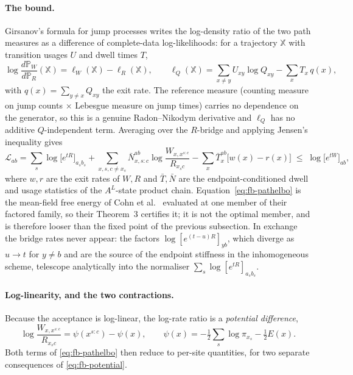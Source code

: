 \paragraph{The bound.} Girsanov's formula for jump processes writes the
log-density ratio of the two path measures as a difference of complete-data
log-likelihoods: for a trajectory $\mathbb{X}$ with transition usages $U$ and
dwell times $T$,
\[
    \log \frac{d\mathbb{P}_W}{d\mathbb{P}_R}(\mathbb{X})
    = \ell_W(\mathbb{X}) - \ell_R(\mathbb{X}),
    \qquad
    \ell_Q(\mathbb{X}) = \sum_{x \neq y} U_{xy} \log Q_{xy}
        - \sum_x T_x\, q(x),
\]
with $q(x) = \sum_{y \neq x} Q_{xy}$ the exit rate. The reference measure
(counting measure on jump counts $\times$ Lebesgue measure on jump times)
carries no dependence on the generator, so this is a genuine Radon--Nikodym
derivative and $\ell_Q$ has no additive $Q$-independent term. Averaging over the
$R$-bridge and applying Jensen's inequality gives
\begin{equation}
\label{eq:fb-pathelbo}
    \mathcal{L}_{ab}
    = \sum_s \log\bigl[e^{tR}\bigr]_{a_s b_s}
    + \sum_{x, s, c \neq x_s} \bar N^{ab}_{x, s:c}
        \log \frac{W_{x, x^{s:c}}}{R_{x_s c}}
    - \sum_x \bar T^{ab}_x \bigl[w(x) - r(x)\bigr]
    \;\leq\; \log\bigl[e^{tW}\bigr]_{ab},
\end{equation}
where $w, r$ are the exit rates of $W, R$ and $\bar T, \bar N$ are the
endpoint-conditioned dwell and usage statistics of the $A^L$-state product
chain. Equation~\eqref{eq:fb-pathelbo} is the mean-field free energy of Cohn et
al.~\citep{cohn2010} evaluated at one member of their factored family, so their
Theorem~3 certifies it; it is not the optimal member, and is therefore looser
than the fixed point of the previous subsection. In exchange the bridge rates
never appear: the factors $\log[e^{(t-u)R}]_{yb}$, which diverge as $u \to t$
for $y \neq b$ and are the source of the endpoint stiffness in the
inhomogeneous scheme, telescope analytically into the normaliser
$\sum_s \log[e^{tR}]_{a_s b_s}$.

\paragraph{Log-linearity, and the two contractions.} Because the acceptance is
log-linear, the log-rate ratio is a \emph{potential difference},
\begin{equation}
\label{eq:fb-potential}
    \log \frac{W_{x, x^{s:c}}}{R_{x_s c}} = \psi(x^{s:c}) - \psi(x),
    \qquad
    \psi(x) = -\tfrac12 \sum_s \log \pi_{x_s} - \tfrac12 E(x).
\end{equation}
Both terms of \eqref{eq:fb-pathelbo} then reduce to per-site quantities, for two
separate consequences of \eqref{eq:fb-potential}.

